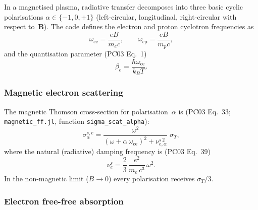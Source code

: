 In a magnetised plasma, radiative transfer decomposes into three basic
cyclic polarisations $\alpha\in\{-1,0,+1\}$ (left-circular, longitudinal,
right-circular with respect to~$\boldsymbol{B}$).  The code defines the
electron and proton cyclotron frequencies as
%
\begin{equation}
\label{eq:cyclotron}
\omega_{\mathrm{ce}} = \frac{eB}{m_e c}, \qquad
\omega_{\mathrm{cp}} = \frac{eB}{m_p c},
\end{equation}
%
and the quantisation parameter (PC03 Eq.~1)
%
\begin{equation}
\label{eq:beta_e}
\beta_e = \frac{\hbar\omega_{\mathrm{ce}}}{k_B T}.
\end{equation}

\subsubsection{Magnetic electron scattering}
\label{sec:opacity:mag:scat_e}

\noindent
The magnetic Thomson cross-section for polarisation~$\alpha$ is
(PC03 Eq.~33; \texttt{magnetic\_ff.jl}, function
\texttt{sigma\_scat\_alpha}):
%
\begin{equation}
\label{eq:sigma_scat_e}
\sigma_\alpha^{s,e}
  = \frac{\omega^2}{(\omega + \alpha\,\omega_{\mathrm{ce}})^2
         + \nu_{e,\alpha}^{s\,2}}\;\sigma_T,
\end{equation}
%
where the natural (radiative) damping frequency is (PC03 Eq.~39)
%
\begin{equation}
\label{eq:nu_e_s}
\nu_e^s = \frac{2}{3}\,\frac{e^2}{m_e\,c^3}\,\omega^2.
\end{equation}
%
In the non-magnetic limit ($B \to 0$) every polarisation receives
$\sigma_T/3$.

\subsubsection{Electron free-free absorption}
\label{sec:opacity:mag:ff}

